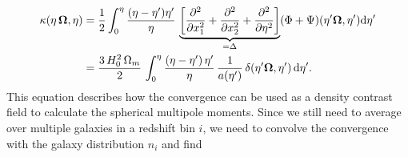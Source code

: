 \documentclass[../main.tex]{subfiles}
\begin{document}
\begin{align}
\kappa(\eta\,\boldsymbol{\Omega},\eta) &= \frac{1}{2} \int_0^\eta \frac{(\eta-\eta')\eta'}{\eta}\, \underbrace{\left[\frac{\partial^2}{\partial x_1^2}+\frac{\partial^2}{\partial x_2^2}+\frac{\partial^2}{\partial \eta^2}\right]}_{=\Delta}(\Phi+\Psi)(\eta'\boldsymbol{\Omega},\eta') \mathrm{d} \eta'  \nonumber \\
&= \frac{3\,H_0^2\,\Omega_m}{2}\,\int_0^\eta \frac{(\eta-\eta')\,\eta'}{\eta}\,\frac{1}{a(\eta')}\,\delta(\eta'\boldsymbol{\Omega},\eta') \,\mathrm{d}\eta'.
\end{align}
This equation describes how the convergence can be used as a density contrast field to calculate the spherical multipole moments. Since we still need to average over multiple galaxies in a redshift bin $i$, we need to convolve the convergence with the galaxy distribution $n_i$ and find 
\end{document}
